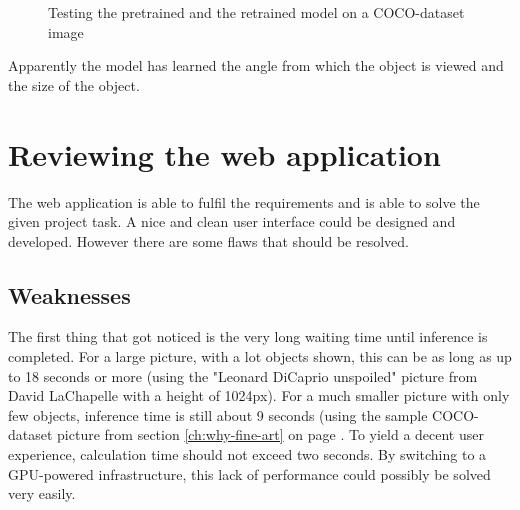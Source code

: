 \begin{figure}[H]
    \centering
    \caption{\label{fig:sample-input-output} Testing the pretrained and the retrained model on a COCO-dataset image}
\end{figure}

Apparently the model has learned the angle from which the object is viewed and the size of the object.

\section{Reviewing the web application}

The web application is able to fulfil the requirements and is able to solve the given project task. A nice and clean user interface could be designed and developed. However there are some flaws that should be resolved.

\subsection{Weaknesses}

The first thing that got noticed is the very long waiting time until inference is completed. For a large picture, with a lot objects shown, this can be as long as up to 18 seconds or more (using the "Leonard DiCaprio unspoiled" picture from David LaChapelle with a height of 1024px). For a much smaller picture with only few objects, inference time is still about 9 seconds (using the sample COCO-dataset picture from section \ref{ch:why-fine-art} on page \pageref{ch:why-fine-art}. To yield a decent user experience, calculation time should not exceed two seconds. By switching to a GPU-powered infrastructure, this lack of performance could possibly be solved very easily.

